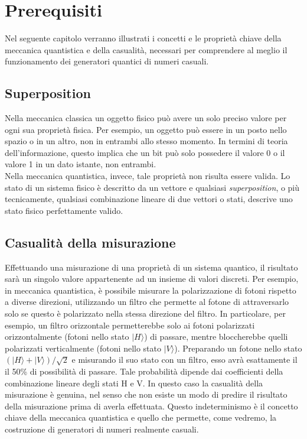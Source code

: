\chapter{Prerequisiti}

Nel seguente capitolo verranno illustrati i concetti e le proprietà chiave della meccanica quantistica e della casualità, necessari per comprendere al meglio il funzionamento dei generatori quantici di numeri casuali.

\section{Superposition}
Nella meccanica classica un oggetto fisico può avere un solo preciso valore per ogni sua proprietà fisica. Per esempio, un oggetto può essere in un posto nello spazio o in un altro, non in entrambi allo stesso momento. In termini di teoria dell'informazione, questo implica che un bit può solo possedere il valore 0 o il valore 1 in un dato istante, non entrambi. \\Nella meccanica quantistica, invece, tale proprietà non risulta essere valida. Lo stato di un sistema fisico è descritto da un vettore e qualsiasi \textit{superposition}, o più tecnicamente, qualsiasi combinazione lineare di due vettori o stati, descrive uno stato fisico perfettamente valido. 

\section{Casualità della misurazione}
Effettuando una misurazione di una proprietà di un sistema quantico, il risultato sarà un singolo valore appartenente ad un insieme di valori discreti. Per esempio, in meccanica quantistica, è possibile misurare la polarizzazione di fotoni rispetto a diverse direzioni, utilizzando un filtro che permette al fotone di attraversarlo solo se questo è polarizzato nella stessa direzione del filtro. In particolare, per esempio, un filtro orizzontale permetterebbe solo ai fotoni polarizzati orizzontalmente (fotoni nello stato $|H\rangle$) di passare, mentre bloccherebbe quelli polarizzati verticalmente (fotoni nello stato $|V\rangle$). Preparando un fotone nello stato $(|H\rangle + |V\rangle)/\sqrt{2}$ e misurando il suo stato con un filtro, esso avrà esattamente il il 50\% di possibilità di passare. Tale probabilità dipende dai coefficienti della combinazione lineare degli stati H e V. In questo caso la casualità della misurazione è genuina, nel senso che non esiste un modo di predire il risultato della misurazione prima di averla effettuata. Questo indeterminismo è il concetto chiave della meccanica quantistica e quello che permette, come vedremo, la costruzione di generatori di numeri realmente casuali.

